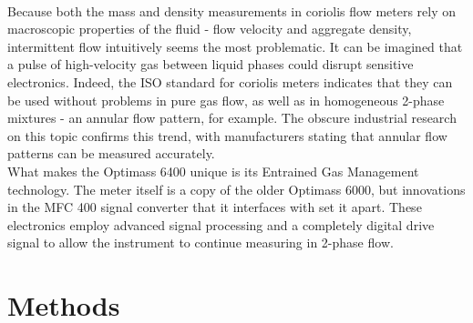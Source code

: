 \documentclass{report}
\begin{document}
\\
Because both the mass and density measurements in coriolis flow meters rely on macroscopic properties of the fluid - flow velocity and aggregate density, intermittent flow intuitively seems the most problematic. It can be imagined that a pulse of high-velocity gas between liquid phases could disrupt sensitive electronics. Indeed, the ISO standard for coriolis meters indicates that they can be used without problems in pure gas flow, as well as in homogeneous 2-phase mixtures - an annular flow pattern, for example. \cite{ISO} The obscure industrial research on this topic confirms this trend, with manufacturers stating that annular flow patterns can be measured accurately. \cite{emerson2Phase}\\
What makes the Optimass 6400 unique is its Entrained Gas Management technology. The meter itself is a copy of the older Optimass 6000, but innovations in the MFC 400 signal converter that it interfaces with set it apart. These electronics employ advanced signal processing and a completely digital drive signal to allow the instrument to continue measuring in 2-phase flow. \cite{krohne brochure}\cite{processArticle}\\

\chapter{Methods} 
\label{methods}
\vspace{-1cm}
\end{document}
